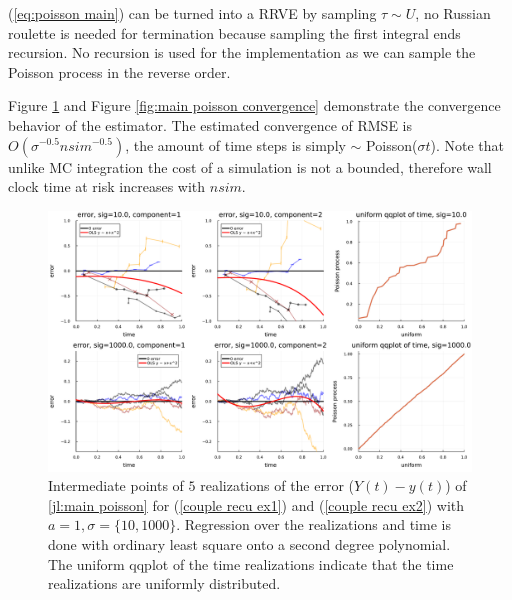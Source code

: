 \documentclass[a4paper,12pt]{article}
\begin{document}
\begin{julia} \label{jl:main poisson}
  (\ref{eq:poisson main}) can be turned into a RRVE by sampling $\tau \sim U$, no Russian roulette is needed for
  termination because sampling the first integral ends recursion. No recursion is used
  for the implementation as we can sample the Poisson process in the reverse order.


  Figure \ref{fig:main poisson error} and Figure \ref{fig:main poisson convergence} demonstrate the convergence
  behavior of the estimator. The estimated convergence of RMSE is $O(\sigma^{-0.5} nsim^{-0.5})$, the amount of
  time steps is simply $\sim$ Poisson($\sigma t$). Note that unlike MC integration the cost of a simulation is not
  a bounded, therefore wall clock time at risk increases with $nsim$.

\end{julia}

\begin{figure}[h!]
  \centering
  \includegraphics[width=\textwidth]{julia_plots/main_poisson_error.pdf}
  \caption{
    Intermediate points of $5$ realizations of the error ($Y(t)-y(t)$) of \ref{jl:main poisson} for (\ref{couple recu ex1}) and (\ref{couple recu ex2}) with $a=1, \sigma = \{10,1000\}$.
    Regression over the realizations and time is done with ordinary least square onto
    a second degree polynomial. The uniform qqplot of the time realizations indicate that the time realizations
    are uniformly distributed.
  }
  \label{fig:main poisson error}
\end{figure}
\end{document}
